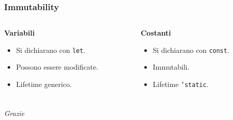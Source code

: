 \documentclass{beamer}
\newcommand{\textcode}[1]{\colorbox{backcolour}{\texttt{#1}}}
\begin{document}
\begin{frame}
    \frametitle{Immutability}
    \begin{columns}
        \begin{column}{0.5\textwidth}
            \textbf{Variabili}
            \begin{itemize}
                \item Si dichiarano con \textcode{let}.
                \item Possono essere modificate.
                \item Lifetime generico.
            \end{itemize}
        \end{column}

        \begin{column}{0.5\textwidth}
            \textbf{Costanti}
            \begin{itemize}
                \item Si dichiarano con \textcode{const}.
                \item Immutabili.
                \item Lifetime \textcode{'static}.
            \end{itemize}
        \end{column}
    \end{columns}
\end{frame}

\begin{frame}
    \frametitle{}
    \centering \huge
    \emph{Grazie}
\end{frame}
\end{document}
